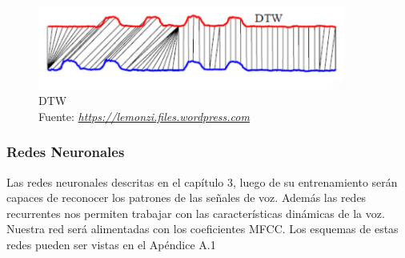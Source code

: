\begin{figure}[H]
	\centering
	\includegraphics[width=0.9\textwidth]{Figures/dtw.png}
	\caption{DTW\\ Fuente:  \href{https://lemonzi.files.wordpress.com/2013/01/dtw.pdf}{\textit{https://lemonzi.files.wordpress.com}}}
	\label{onda}
\end{figure} 
\newpage
\subsubsection{Redes Neuronales}
Las redes neuronales descritas en el capítulo 3, luego de su entrenamiento serán capaces de reconocer los patrones de las señales de voz. Además las redes recurrentes nos permiten trabajar con las características dinámicas de la voz. Nuestra red será alimentadas con los coeficientes MFCC. Los esquemas de estas redes pueden ser vistas en el Apéndice A.1
